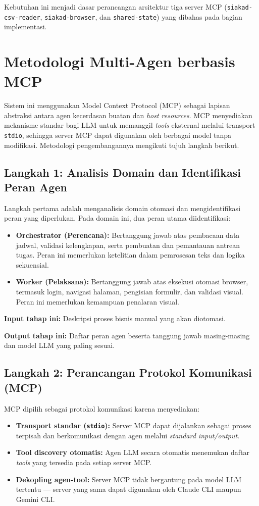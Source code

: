 Kebutuhan ini menjadi dasar perancangan arsitektur tiga server MCP (\texttt{siakad-csv-reader}, \texttt{siakad-browser}, dan \texttt{shared-state}) yang dibahas pada bagian implementasi.

\section{Metodologi Multi-Agen berbasis MCP}

Sistem ini menggunakan Model Context Protocol (MCP) sebagai lapisan abstraksi antara agen kecerdasan buatan dan \textit{host resources}. MCP menyediakan mekanisme standar bagi LLM untuk memanggil \textit{tools} eksternal melalui transport \texttt{stdio}, sehingga server MCP dapat digunakan oleh berbagai model tanpa modifikasi. Metodologi pengembangannya mengikuti tujuh langkah berikut.

\subsection[Langkah 1: Analisis Domain]{Langkah 1: Analisis Domain dan Identifikasi Peran Agen}

Langkah pertama adalah menganalisis domain otomasi dan mengidentifikasi peran yang diperlukan. Pada domain ini, dua peran utama diidentifikasi:
\begin{itemize}
  \item \textbf{Orchestrator (Perencana):} Bertanggung jawab atas pembacaan data jadwal, validasi kelengkapan, serta pembuatan dan pemantauan antrean tugas. Peran ini memerlukan ketelitian dalam pemrosesan teks dan logika sekuensial.
  \item \textbf{Worker (Pelaksana):} Bertanggung jawab atas eksekusi otomasi browser, termasuk login, navigasi halaman, pengisian formulir, dan validasi visual. Peran ini memerlukan kemampuan penalaran visual.
\end{itemize}

\textbf{Input tahap ini:} Deskripsi proses bisnis manual yang akan diotomasi.

\textbf{Output tahap ini:} Daftar peran agen beserta tanggung jawab masing-masing dan model LLM yang paling sesuai.

\subsection{Langkah 2: Perancangan Protokol Komunikasi (MCP)}

MCP dipilih sebagai protokol komunikasi karena menyediakan:
\begin{itemize}
  \item \textbf{Transport standar (\texttt{stdio}):} Server MCP dapat dijalankan sebagai proses terpisah dan berkomunikasi dengan agen melalui \textit{standard input/output}.
  \item \textbf{Tool discovery otomatis:} Agen LLM secara otomatis menemukan daftar \textit{tools} yang tersedia pada setiap server MCP.
  \item \textbf{Dekopling agen-tool:} Server MCP tidak bergantung pada model LLM tertentu --- server yang sama dapat digunakan oleh Claude CLI maupun Gemini CLI.
\end{itemize}

